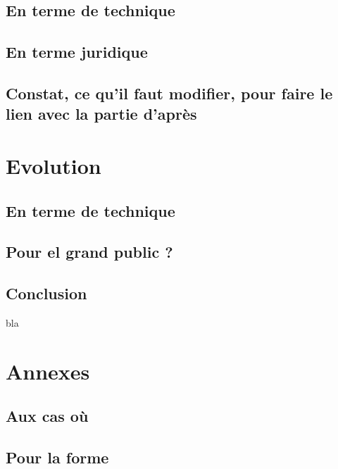 \documentclass[a4paper]{memoir}
\begin{document}
\chapter{En terme de technique}

\chapter{En terme juridique}

\chapter{Constat, ce qu'il faut modifier, pour faire le lien avec la partie d'après}


\part{Evolution}

\chapter{En terme de technique}

\chapter{Pour el grand public ?}


\chapter*{Conclusion}

bla 


\part*{Annexes}
\appendix

\chapter{Aux cas où}

\chapter{Pour la forme}


\backmatter%

\nocite{*}



\printindex
\end{document}

